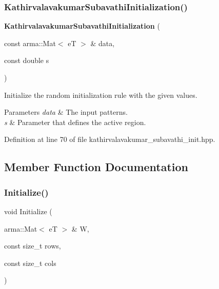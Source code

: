 \subsubsection{Kathirvalavakumar\+Subavathi\+Initialization()}
{\footnotesize\ttfamily \textbf{ Kathirvalavakumar\+Subavathi\+Initialization} (\begin{DoxyParamCaption}\item[{const arma\+::\+Mat$<$ eT $>$ \&}]{data,  }\item[{const double}]{s }\end{DoxyParamCaption})\hspace{0.3cm}{\ttfamily [inline]}}



Initialize the random initialization rule with the given values. 


\begin{DoxyParams}{Parameters}
{\em data} & The input patterns. \\
\hline
{\em s} & Parameter that defines the active region. \\
\hline
\end{DoxyParams}


Definition at line 70 of file kathirvalavakumar\+\_\+subavathi\+\_\+init.\+hpp.



\subsection{Member Function Documentation}
\mbox{\label{classmlpack_1_1ann_1_1KathirvalavakumarSubavathiInitialization_a5cfe472251a41fffd45b170bb0d3c1bd}} 
\subsubsection{Initialize()\hspace{0.1cm}{\footnotesize\ttfamily [1/4]}}
{\footnotesize\ttfamily void Initialize (\begin{DoxyParamCaption}\item[{arma\+::\+Mat$<$ eT $>$ \&}]{W,  }\item[{const size\+\_\+t}]{rows,  }\item[{const size\+\_\+t}]{cols }\end{DoxyParamCaption})\hspace{0.3cm}{\ttfamily [inline]}}



